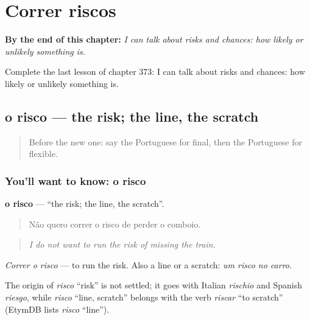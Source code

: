 
\chapter{Correr riscos}
\label{ch:pt-correr-riscos}

\begin{chapteropening}
\textbf{By the end of this chapter:} \emph{I can talk about risks and chances: how likely or unlikely something is.}

Complete the last lesson of chapter 373: I can talk about risks and chances: how likely or unlikely something is.
\end{chapteropening}

\section[o risco]{o risco — the risk; the line, the scratch}

\label{lesson:PT-C373-risco}



\begin{quote}
Before the new one: say the Portuguese for final, then the Portuguese for flexible.
\end{quote}

\subsection*{You'll want to know: o risco}
\textbf{o risco} — \textquotedblleft{}the risk; the line, the scratch\textquotedblright{}.

\begin{quote}
Não quero correr o risco de perder o comboio.
\end{quote}

\begin{quote}
\emph{I do not want to run the risk of missing the train.}
\end{quote}

\emph{Correr o risco} — to run the risk. Also a line or a scratch: \emph{um risco no carro}.

\begin{cousinweb}
The origin of \emph{risco} \textquotedblleft{}risk\textquotedblright{} is not settled; it goes with Italian \emph{rischio} and Spanish \emph{riesgo}, while \emph{risco} \textquotedblleft{}line, scratch\textquotedblright{} belongs with the verb \emph{riscar} \textquotedblleft{}to scratch\textquotedblright{} (EtymDB lists \emph{risco} \textquotedblleft{}line\textquotedblright{}).
\end{cousinweb}

